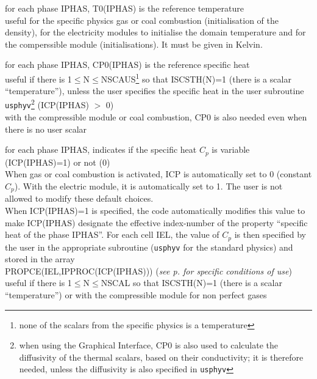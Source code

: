 {for each phase IPHAS, T0(IPHAS) is the reference temperature \\
useful for the specific physics gas or coal combustion (initialisation
of the density), for the electricity modules to initialise the domain
temperature and for the comperssible module (initialisations). It must be given
in Kelvin.}

{for each phase IPHAS, CP0(IPHAS) is the reference specific heat\\
useful if there is 1$\leqslant$N$\leqslant$NSCAUS\footnote{none of the scalars
from the specific physics is a temperature} so that ISCSTH(N)=1
(there is a scalar ``temperature''), unless the user specifies the
specific heat in the user subroutine \texttt{usphyv}\footnote{when using the
Graphical Interface, CP0 is also used to calculate the diffusivity of the
thermal scalars, based on their conductivity; it is therefore needed, unless the
diffusivity is also specified in \texttt{usphyv}} (ICP(IPHAS) $>$ 0)\\
with the compressible module or coal combustion, CP0 is also needed even when
there is no user scalar}

{for each phase IPHAS, indicates if the specific heat $C_p$ is variable
(ICP(IPHAS)=1) or not (0)\\
When gas or coal combustion is activated, ICP is automatically set to 0
(constant $C_p$). With the electric module, it is automatically set to 1.
The user is not allowed to modify these default choices.\\
When ICP(IPHAS)=1 is specified, the code automatically modifies this value to
make ICP(IPHAS) designate the effective index-number of the property
``specific heat of the phase IPHAS''. For each cell IEL, the value of
$C_p$ is then specified by the user in the appropriate subroutine
(\texttt{usphyv} for the standard physics) and stored in the array\\
PROPCE(IEL,IPPROC(ICP(IPHAS)))
({\em see p.\pageref{prg_propvar} for specific conditions of use})\\
useful if there is 1$\leqslant$N$\leqslant$NSCAL so that ISCSTH(N)=1
(there is a scalar ``temperature'') or with the compressible module for non
perfect gases}

